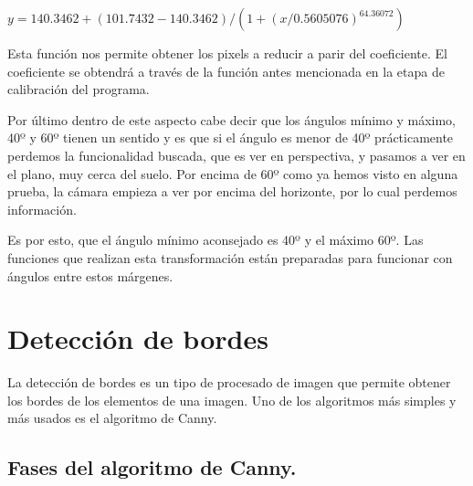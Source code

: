 $y = 140.3462 + (101.7432 - 140.3462)/(1 + (x/0.5605076)^64.36072)$

Esta función nos permite obtener los pixels a reducir a parir del coeficiente. El coeficiente se obtendrá a través de la función antes mencionada en la etapa de calibración del programa.

Por último dentro de este aspecto cabe decir que los ángulos mínimo y máximo, 40º y 60º tienen un sentido y es que si el ángulo es menor de 40º prácticamente perdemos la funcionalidad buscada, que es ver en perspectiva, y pasamos a ver en el plano, muy cerca del suelo. Por encima de 60º como ya hemos visto en alguna prueba, la cámara empieza a ver por encima del horizonte, por lo cual perdemos información.

Es por esto, que el ángulo mínimo aconsejado es 40º y el máximo 60º. Las funciones que realizan esta transformación están preparadas para funcionar con ángulos entre estos márgenes.


\section{Detección de bordes}
La detección de bordes es un tipo de procesado de imagen que permite obtener los bordes de los elementos de una imagen. Uno de los algoritmos más simples y más usados es el algoritmo de Canny\cite{canny_edge}. 

\subsection{Fases del algoritmo de Canny.}

